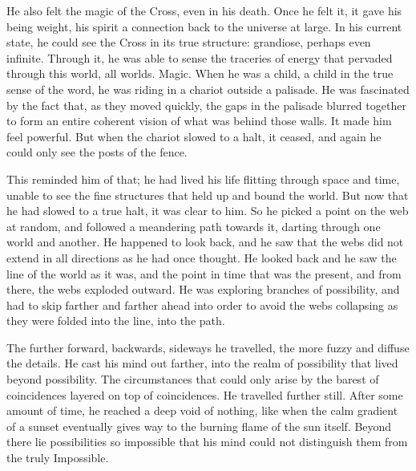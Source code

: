 He also felt the magic of the Cross, even in his death. Once he felt it, it gave his being weight, his spirit a connection back to the universe at large. In his current state, he could see the Cross in its true structure: grandiose, perhaps even infinite. Through it, he was able to sense the traceries of energy that pervaded through this world, all worlds. Magic.
\SmallVSpace
When he was a child, a child in the true sense of the word, he was riding in a chariot outside a palisade. He was fascinated by the fact that, as they moved quickly, the gaps in the palisade blurred together to form an entire coherent vision of what was behind those walls. It made him feel powerful. But when the chariot slowed to a halt, it ceased, and again he could only see the posts of the fence.

This reminded him of that; he had lived his life flitting through space and time, unable to see the fine structures that held up and bound the world. But now that he had slowed to a true halt, it was clear to him. So he picked a point on the web at random, and followed a meandering path towards it, darting through one world and another.
\SmallVSpace
He happened to look back, and he saw that the webs did not extend in all directions as he had once thought. He looked back and he saw the line of the world as it was, and the point in time that was the present, and from there, the webs exploded outward. He was exploring branches of possibility, and had to skip farther and farther ahead into order to avoid the webs collapsing as they were folded into the line, into the path.

The further forward, backwards, sideways he travelled, the more fuzzy and diffuse the details. He cast his mind out farther, into the realm of possibility that lived beyond possibility. The circumstances that could only arise by the barest of coincidences layered on top of coincidences. He travelled further still. After some amount of time, he reached a deep void of nothing, like when the calm gradient of a sunset eventually gives way to the burning flame of the sun itself. Beyond there lie possibilities so impossible that his mind could not distinguish them from the truly Impossible.

